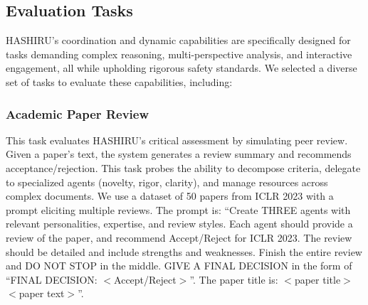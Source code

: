 \documentclass[conference]{IEEEtran}
\begin{document}
\subsection{Evaluation Tasks}
\label{subsec:tasks}
HASHIRU's coordination and dynamic capabilities are specifically designed for tasks demanding complex reasoning, multi-perspective analysis, and interactive engagement, all while upholding rigorous safety standards. We selected a diverse set of tasks to evaluate these capabilities, including:

\subsubsection{Academic Paper Review}
This task evaluates HASHIRU's critical assessment by simulating peer review. Given a paper's text, the system generates a review summary and recommends acceptance/rejection. This task probes the ability to decompose criteria, delegate to specialized agents (novelty, rigor, clarity), and manage resources across complex documents.
We use a dataset of 50 papers from ICLR 2023 with a prompt eliciting multiple reviews. The prompt is: ``Create THREE agents with relevant personalities, expertise, and review styles. Each agent should provide a review of the paper, and recommend Accept/Reject for ICLR 2023. The review should be detailed and include strengths and weaknesses. Finish the entire review and DO NOT STOP in the middle. GIVE A FINAL DECISION in the form of ``FINAL DECISION: $<$Accept/Reject$>$''. The paper title is: $<$paper title$>$ $<$paper text$>$''.
\end{document}
